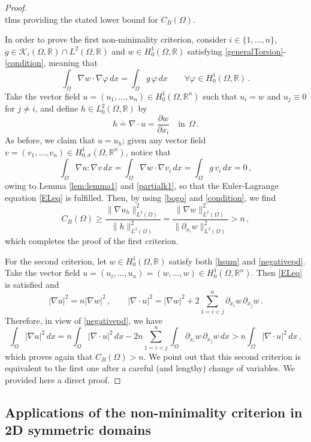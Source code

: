 \documentclass[11pt]{article}
\theoremstyle{plain}
\theoremstyle{definition}
\numberwithin{equation}{section}
\begin{document}
\begin{proof}
$$	$$
	thus providing the stated lower bound for $C_B(\Omega)$.\par
	In order to prove the first non-minimality criterion, consider $i \in \{1,...,n\}$, $g\in\mathcal{K}_{i}(\Omega, \mathbb{R}) \cap L^{2}(\Omega, \mathbb{R})$ and $w\in H^1_0(\Omega, \mathbb{R})$  satisfying \eqref{generalTorsion}-\eqref{condition}, meaning that
	\begin{equation}\label{partialk1}
	\int_\Omega \nabla w \cdot \nabla \varphi  \, dx = \int_\Omega g \, \varphi \, dx\qquad \forall \varphi \in H^1_0(\Omega, \mathbb{R}) \, .
	\end{equation}
	Take the vector field
	$u=(u_1,...,u_n)\in H^1_0(\Omega, \mathbb{R}^{n})$ such that $u_i=w$ and $u_j\equiv0$ for $j \neq i$, and define $h \in L_{0}^{2}(\Omega, \mathbb{R})$ by
	$$
	h\doteq\nabla\cdot u=\dfrac{\partial w}{\partial x_{i}} \quad \text{in} \ \ \Omega \, .
	$$
	As before, we claim that $u = u_h$; given any vector field $v = (v_{1},...,v_{n}) \in H^{1}_{0,\sigma}(\Omega, \mathbb{R}^{n})$, notice that
	$$
	\int_{\Omega} \nabla u : \nabla v \, dx= \int_{\Omega} \nabla w \cdot \nabla v_{i} \, dx= \int_{\Omega} g \, v_{i}\, dx = 0 \, ,
	$$
	owing to Lemma \ref{lem:lemma1} and \eqref{partialk1}, so that the Euler-Lagrange equation \eqref{ELeq} is fulfilled.  Then, by using \eqref{bogo} and \eqref{condition}, we find
	$$
	C_B(\Omega)\ge\frac{\|\nabla u_{h}\|_{L^2(\Omega)}^2}{\|h\|_{L^2(\Omega)}^2}=\frac{\|\nabla w\|_{L^2(\Omega)}^2}{\|\partial_{x_i}w\|_{L^2(\Omega)}^2}>n\, ,
	$$
	which completes the proof of the first criterion.\par
For the second criterion, let $w\in H^1_0(\Omega, \mathbb{R})$ satisfy both \eqref{hsum} and \eqref{negativepd}.
Take the vector field $u=(u_i,...,u_n)=(w,...,w)\in H^1_0(\Omega, \mathbb{R}^{n})$. Then \eqref{ELeq} is satisfied and
$$
|\nabla u|^2=n|\nabla w|^2\, ,\qquad|\nabla\cdot u|^2=|\nabla w|^2+2\sum_{1=i<j}^{n}\partial_{x_i}w\, \partial_{x_j}w\, .
$$
Therefore, in view of \eqref{negativepd}, we have
$$
\int_\Omega|\nabla u|^2\, dx=n\int_\Omega|\nabla\cdot u|^2\, dx-2n\sum_{1=i<j}^{n}\int_\Omega\partial_{x_i}w\, \partial_{x_j}w\, dx>n\int_\Omega|\nabla\cdot u|^2\, dx\, ,
$$
which proves again that $C_B(\Omega)>n$. We point out that this second criterion is equivalent to the first one after a careful
(and lengthy) change of variables. We provided here a direct proof.\end{proof}

\subsection{Applications of the non-minimality criterion in 2D symmetric domains}\label{applications}
\end{document}
